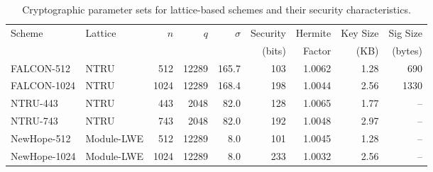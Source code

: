 
\begin{table}[ht]
\centering
\caption{Cryptographic parameter sets for lattice-based schemes and their security characteristics.}
\label{tab:crypto_parameters}
\begin{tabular}{l|l|r|r|r|r|r|r|r}
\toprule
Scheme & Lattice & $n$ & $q$ & $\sigma$ & Security & Hermite & Key Size & Sig Size \\
 &  &  &  &  & (bits) & Factor & (KB) & (bytes) \\
\midrule
FALCON-512 & NTRU & 512 & 12289 & 165.7 & 103 & 1.0062 & 1.28 & 690 \\
FALCON-1024 & NTRU & 1024 & 12289 & 168.4 & 198 & 1.0044 & 2.56 & 1330 \\
\midrule
NTRU-443 & NTRU & 443 & 2048 & 82.0 & 128 & 1.0065 & 1.77 & -- \\
NTRU-743 & NTRU & 743 & 2048 & 82.0 & 192 & 1.0048 & 2.97 & -- \\
\midrule
NewHope-512 & Module-LWE & 512 & 12289 & 8.0 & 101 & 1.0045 & 1.28 & -- \\
NewHope-1024 & Module-LWE & 1024 & 12289 & 8.0 & 233 & 1.0032 & 2.56 & -- \\
\bottomrule
\end{tabular}
\end{table}
